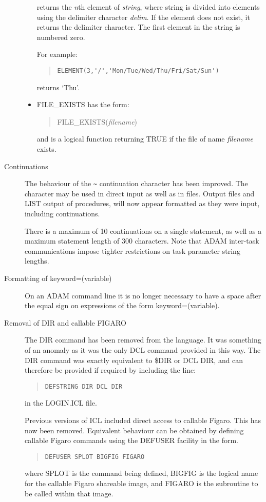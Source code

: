 \begin{description}
\begin{itemize}
returns the {\em n}\/th element of {\em string}, where string is divided into 
elements using the delimiter character {\em delim}. 
If the element does not exist, it returns the delimiter character. 
The first element in the string is numbered zero.

For example:
\begin{quote}
\begin{verbatim}
ELEMENT(3,'/','Mon/Tue/Wed/Thu/Fri/Sat/Sun')
\end{verbatim}
\end{quote}
returns `Thu'.

\item FILE\_EXISTS has the form:
\begin{quote}
FILE\_EXISTS({\em filename})
\end{quote}
and is a logical function returning TRUE if the file of name {\em filename}
exists.
\end{itemize}

\item[Continuations]
The behaviour of the \verb+~+ continuation character has been improved. 
The character may be used in direct input as well as in files. 
Output files and LIST output of procedures, will now appear formatted as they 
were input, including continuations.

There is a maximum of 10 continuations on a single statement, as well as a
maximum statement length of 300 characters.
Note that ADAM inter-task communications impose tighter restrictions on
task parameter string lengths.

\item[Formatting of keyword=(variable)]
On an ADAM command line it is no longer necessary to have a space after the
equal sign on expressions of the form keyword=(variable).

\item[Removal of DIR and callable FIGARO]
The DIR command has been removed from the language. It was something of an
anomaly as it was the only DCL command provided in this way. The DIR command
was exactly equivalent to \$DIR or DCL DIR, and can therefore be provided
if required by including the line:
\begin{quote}
\begin{verbatim}
DEFSTRING DIR DCL DIR
\end{verbatim}
\end{quote}
in the LOGIN.ICL file.

Previous versions of ICL included direct access to callable Figaro. This has
now been removed. Equivalent behaviour can be obtained by defining callable
Figaro commands using the DEFUSER facility in the form.
\begin{quote}
\begin{verbatim}
DEFUSER SPLOT BIGFIG FIGARO
\end{verbatim}
\end{quote}
where SPLOT is the command being defined, BIGFIG is the logical name for the
callable Figaro shareable image, and FIGARO is the subroutine to be called
within that image.


\end{description}
